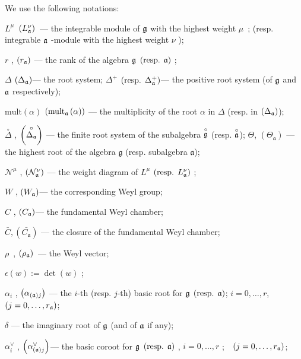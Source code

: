 \documentclass[a4paper,12pt]{article}
\theoremstyle{definition}
\theoremstyle{definition}
\theoremstyle{definition}
\newcommand{\co}[1]{\stackrel{\circ }{#1}}
\newcommand{\af}{\mathfrak{a}}
\begin{document}
We use the following notations:

$L^{\mu }$\ $\left( L_{\frak{a}}^{\nu }\right) $\ --- the integrable module
of $\frak{g}$ with the highest weight $\mu $\ ; (resp. integrable $\frak{a}$
-module with the highest weight $\nu $ );

$r$ , $\left( r_{\frak{a}}\right) $ --- the rank of the algebra $\frak{g}$ $%
\left( \mbox{resp. }\frak{a}\right) $ ;

$\Delta $ $\left( \Delta _{\frak{a}}\right) $--- the root system; $\Delta
^{+} $ $\left( \mbox{resp. }\Delta _{\frak{a}}^{+}\right) $--- the positive
root system (of $\frak{g}$ and $\frak{a}$ respectively);

$\mathrm{mult}\left( \alpha \right) $ $\left( \mathrm{mult}_{\frak{a}}\left(
\alpha \right) \right) $ --- the multiplicity of the root $\alpha$ in $\Delta
$ (resp. in $\left( \Delta _{\frak{a}}\right) $);

$\co{\Delta}$ , $\left( \co{\Delta _{\frak{a}}}%
\right)$ --- the finite root system of the subalgebra $\co{%
\frak{g}}$ (resp. $\co{\frak{a}}$);
$\Theta$, $(\Theta_{\af})$ --- the highest root of the algebra $\mathfrak{g}$ (resp. subalgebra $\af$);

$\mathcal{N}^{\mu }$ , $\left( \mathcal{N}_{\frak{a}}^{\nu }\right) $ --- the
weight diagram of $L^{\mu }$ $\left( \mbox{resp. }L_{\frak{a}}^{\nu }\right)
$ ;

$W$ , $\left( W_{\frak{a}}\right) $--- the corresponding Weyl group;

$C$ , $\left( C_{\frak{a}}\right) $--- the fundamental Weyl chamber;

$\bar{C}, \left(\bar{C_{\af}}\right)$ --- the closure of the fundamental Weyl chamber;

$\rho $\ , $\left( \rho _{\frak{a}}\right) $\ --- the Weyl vector;

$\epsilon \left( w\right) :=\det \left( w\right) $ ;

$\alpha _{i}$ , $\left( \alpha _{\left( \frak{a}\right) j}\right) $ --- the $i
$-th (resp. $j$-th) basic root for $\frak{g}$ $\left( \mbox{resp. }\frak{a}%
\right) $; $i=0,\ldots ,r$,\ \ $\left( j=0,\ldots ,r_{\frak{a}}\right) $;

$\delta $ --- the imaginary root of $\frak{g}$ (and of $\frak{a}$ if any);

$\alpha _{i}^{\vee }$ , $\left( \alpha _{\left( \frak{a}\right) j}^{\vee
}\right) $--- the basic coroot for $\frak{g}$ $\left( \mbox{resp. }\frak{a}%
\right) $ , $i=0,\ldots ,r$ ;\ \ $\left( j=0,\ldots ,r_{\frak{a}}\right) $;
\end{document}
